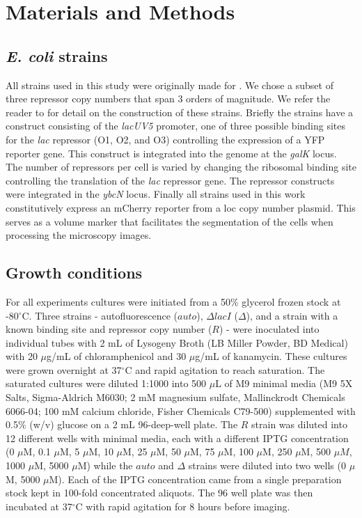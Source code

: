 \section{Materials and Methods}

\subsection{\textit{E. coli} strains}

All strains used in this study were originally made for \cite{Razo-Mejia2018}.
We chose a subset of three repressor copy numbers that span 3 orders of
magnitude. We refer the reader to \cite{Razo-Mejia2018} for detail on the
construction of these strains. Briefly the strains have a construct consisting
of the \textit{lacUV5} promoter, one of three possible binding sites for the
\textit{lac} repressor (O1, O2, and O3) controlling the expression of a YFP
reporter gene. This construct is integrated into the genome at the
\textit{galK} locus. The number of repressors per cell is varied by changing the
ribosomal binding site controlling the translation of the \textit{lac} repressor
gene. The repressor constructs were integrated in the \textit{ybcN} locus.
Finally all strains used in this work constitutively express an mCherry
reporter from a loc copy number plasmid. This serves as a volume marker that
facilitates the segmentation of the cells when processing the microscopy images.

\subsection{Growth conditions}

For all experiments cultures were initiated from a 50\% glycerol frozen stock at
-80$^\circ$C. Three strains - autofluorescence ($auto$), $\Delta lacI$
($\Delta$), and a strain with a known binding site and repressor copy number
($R$) - were inoculated into individual tubes with 2 mL of Lysogeny Broth (LB
Miller Powder, BD Medical) with 20 $\mu$g/mL of chloramphenicol and 30 $\mu$g/mL
of kanamycin. These cultures were grown overnight at 37$^\circ$C and rapid
agitation to reach saturation. The saturated cultures were diluted 1:1000 into
500 $\mu$L of M9 minimal media (M9 5X Salts, Sigma-Aldrich M6030; 2 mM magnesium
sulfate, Mallinckrodt Chemicals 6066-04; 100 mM calcium chloride, Fisher
Chemicals C79-500) supplemented with 0.5\% (w/v) glucose on a 2 mL 96-deep-well
plate. The $R$ strain was diluted into 12 different wells with minimal media,
each with a different IPTG  concentration (0 $\mu$M, 0.1 $\mu$M, 5 $\mu$M, 10
$\mu$M, 25 $\mu$M, 50 $\mu$M, 75 $\mu$M, 100 $\mu$M, 250 $\mu$M, 500 $\mu M$,
1000 $\mu$M, 5000 $\mu$M) while  the $auto$ and $\Delta$ strains were diluted
into two wells (0 $\mu$M, 5000 $\mu$M). Each of the IPTG concentration came from
a single preparation stock kept in 100-fold concentrated aliquots. The 96 well
plate was then incubated at 37$^\circ$C with rapid agitation for 8 hours before
imaging.

